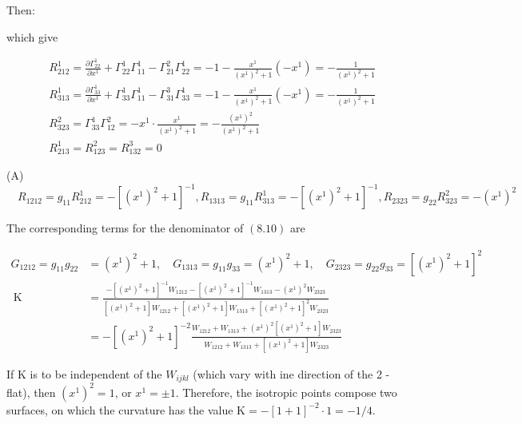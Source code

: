 \documentclass[10pt]{article}
\begin{document}
Then:

which give

$$
\begin{aligned}
& R_{212}^{1}=\frac{\partial \Gamma_{22}^{1}}{\partial x^{1}}+\Gamma_{22}^{1} \Gamma_{11}^{1}-\Gamma_{21}^{2} \Gamma_{22}^{1}=-1-\frac{x^{1}}{\left(x^{1}\right)^{2}+1}\left(-x^{1}\right)=-\frac{1}{\left(x^{1}\right)^{2}+1} \\
& R_{313}^{1}=\frac{\partial \Gamma_{33}^{1}}{\partial x^{1}}+\Gamma_{33}^{1} \Gamma_{11}^{1}-\Gamma_{31}^{3} \Gamma_{33}^{1}=-1-\frac{x^{1}}{\left(x^{1}\right)^{2}+1}\left(-x^{1}\right)=-\frac{1}{\left(x^{1}\right)^{2}+1} \\
& R_{323}^{2}=\Gamma_{33}^{1} \Gamma_{12}^{2}=-x^{1} \cdot \frac{x^{1}}{\left(x^{1}\right)^{2}+1}=-\frac{\left(x^{1}\right)^{2}}{\left(x^{1}\right)^{2}+1} \\
& R_{213}^{1}=R_{123}^{2}=R_{132}^{3}=0
\end{aligned}
$$

(A) $\quad R_{1212}=g_{11} R_{212}^{1}=-\left[\left(x^{1}\right)^{2}+1\right]^{-1}, R_{1313}=g_{11} R_{313}^{1}=-\left[\left(x^{1}\right)^{2}+1\right]^{-1}, R_{2323}=g_{22} R_{323}^{2}=-\left(x^{1}\right)^{2}$

The corresponding terms for the denominator of $(8.10)$ are


\begin{align*}
G_{1212}=g_{11} g_{22} & =\left(x^{1}\right)^{2}+1, \quad G_{1313}=g_{11} g_{33}=\left(x^{1}\right)^{2}+1, \quad G_{2323}=g_{22} g_{33}=\left[\left(x^{1}\right)^{2}+1\right]^{2}  \tag{A}\\
\mathrm{~K} & =\frac{-\left[\left(x^{1}\right)^{2}+1\right]^{-1} W_{1212}-\left[\left(x^{1}\right)^{2}+1\right]^{-1} W_{1313}-\left(x^{1}\right)^{2} W_{2323}}{\left[\left(x^{1}\right)^{2}+1\right] W_{1212}+\left[\left(x^{1}\right)^{2}+1\right] W_{1313}+\left[\left(x^{1}\right)^{2}+1\right]^{2} W_{2323}} \\
& =-\left[\left(x^{1}\right)^{2}+1\right]^{-2} \frac{W_{1212}+W_{1313}+\left(x^{1}\right)^{2}\left[\left(x^{1}\right)^{2}+1\right] W_{2323}}{W_{1212}+W_{1313}+\left[\left(x^{1}\right)^{2}+1\right] W_{2323}}
\end{align*}


If $\mathrm{K}$ is to be independent of the $W_{i j k l}$ (which vary with ine direction of the 2 -flat), then $\left(x^{1}\right)^{2}=1$, or $x^{1}= \pm 1$. Therefore, the isotropic points compose two surfaces, on which the curvature has the value $\mathrm{K}=-[1+1]^{-2} \cdot 1=-1 / 4$.
\end{document}
